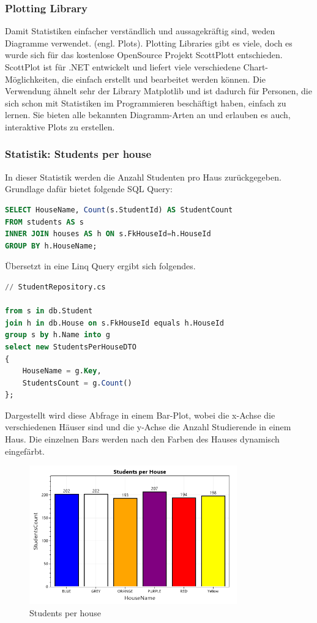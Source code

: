\documentclass[a4paper, table]{article}
\begin{document}
\subsubsection*{Plotting Library}
Damit Statistiken einfacher verständlich und aussagekräftig sind, weden Diagramme verwendet. (engl. Plots). 
Plotting Libraries gibt es viele, doch es wurde sich für das kostenlose OpenSource Projekt ScottPlott entschieden. 
ScottPlot ist für .NET entwickelt und liefert viele verschiedene Chart-Möglichkeiten, die einfach erstellt und bearbeitet werden können. 
Die Verwendung ähnelt sehr der Library Matplotlib und ist dadurch für Personen, die sich schon mit Statistiken im Programmieren beschäftigt haben, einfach zu lernen. 
Sie bieten alle bekannten Diagramm-Arten an und erlauben es auch, interaktive Plots zu erstellen.\autocite{noauthor_scottplot_nodate}

\newpage
\subsubsection*{Statistik: Students per house}
In dieser Statistik werden die Anzahl Studenten pro Haus zurückgegeben.
Grundlage dafür bietet folgende SQL Query:

\begin{lstlisting}[language=SQL]
SELECT HouseName, Count(s.StudentId) AS StudentCount
FROM students AS s
INNER JOIN houses AS h ON s.FkHouseId=h.HouseId
GROUP BY h.HouseName;
\end{lstlisting}

Übersetzt in eine Linq Query ergibt sich folgendes.

\begin{lstlisting}[language=SQL]
// StudentRepository.cs

from s in db.Student
join h in db.House on s.FkHouseId equals h.HouseId
group s by h.Name into g
select new StudentsPerHouseDTO
{
    HouseName = g.Key,
    StudentsCount = g.Count()
};
\end{lstlisting}

Dargestellt wird diese Abfrage in einem Bar-Plot, wobei die x-Achse die verschiedenen Häuser sind und die y-Achse die Anzahl Studierende in einem Haus. 
Die einzelnen Bars werden nach den Farben des Hauses dynamisch eingefärbt.

\begin{figure}[h]
    \centering
    \includegraphics[width=0.8\textwidth]{img/studentsPerHouse.png}
    \caption{Students per house}
    \label{fig:students-per-house}
\end{figure}
\end{document}
